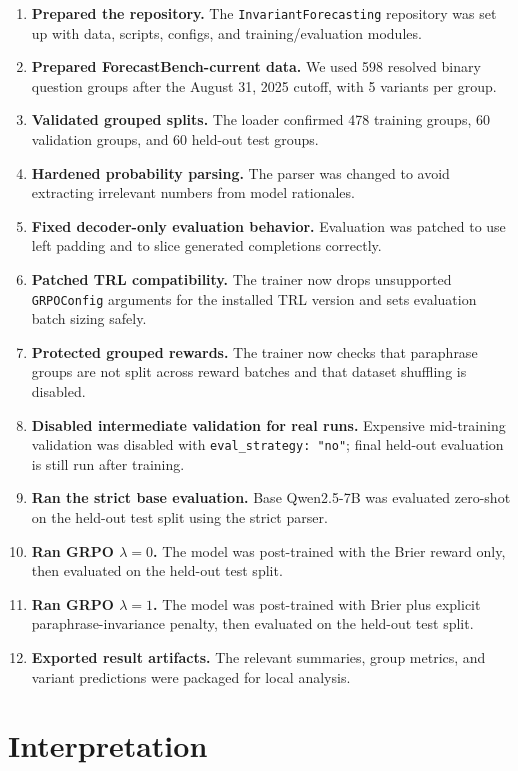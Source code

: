 \documentclass[11pt]{article}
\begin{document}
\begin{enumerate}[leftmargin=*]
  \item \textbf{Prepared the repository.} The \texttt{InvariantForecasting} repository was set up with data, scripts, configs, and training/evaluation modules.
  \item \textbf{Prepared ForecastBench-current data.} We used 598 resolved binary question groups after the August 31, 2025 cutoff, with 5 variants per group.
  \item \textbf{Validated grouped splits.} The loader confirmed 478 training groups, 60 validation groups, and 60 held-out test groups.
  \item \textbf{Hardened probability parsing.} The parser was changed to avoid extracting irrelevant numbers from model rationales.
  \item \textbf{Fixed decoder-only evaluation behavior.} Evaluation was patched to use left padding and to slice generated completions correctly.
  \item \textbf{Patched TRL compatibility.} The trainer now drops unsupported \texttt{GRPOConfig} arguments for the installed TRL version and sets evaluation batch sizing safely.
  \item \textbf{Protected grouped rewards.} The trainer now checks that paraphrase groups are not split across reward batches and that dataset shuffling is disabled.
  \item \textbf{Disabled intermediate validation for real runs.} Expensive mid-training validation was disabled with \texttt{eval\_strategy: "no"}; final held-out evaluation is still run after training.
  \item \textbf{Ran the strict base evaluation.} Base Qwen2.5-7B was evaluated zero-shot on the held-out test split using the strict parser.
  \item \textbf{Ran GRPO $\lambda=0$.} The model was post-trained with the Brier reward only, then evaluated on the held-out test split.
  \item \textbf{Ran GRPO $\lambda=1$.} The model was post-trained with Brier plus explicit paraphrase-invariance penalty, then evaluated on the held-out test split.
  \item \textbf{Exported result artifacts.} The relevant summaries, group metrics, and variant predictions were packaged for local analysis.
\end{enumerate}

\section*{Interpretation}
\end{document}
